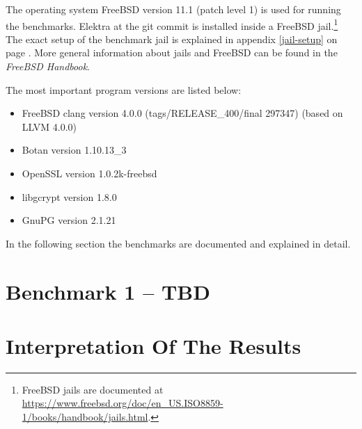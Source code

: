 The operating system FreeBSD version 11.1 (patch level 1) is used for running the benchmarks.
Elektra  at the git commit  is installed inside a FreeBSD jail.\footnote{FreeBSD jails
are documented at \url{https://www.freebsd.org/doc/en_US.ISO8859-1/books/handbook/jails.html}.
}
The exact setup of the benchmark jail is explained in appendix \ref{jail-setup} on page \pageref{jail-setup}.
More general information about jails and FreeBSD can be found in the \emph{FreeBSD Handbook}.\cite{freebsd-doc}

The most important program versions are listed below:

\begin{itemize}
  \item FreeBSD clang version 4.0.0 (tags/RELEASE\_400/final 297347) (based on LLVM 4.0.0)
  \item Botan version 1.10.13\_3
  \item OpenSSL version 1.0.2k-freebsd
  \item libgcrypt version 1.8.0
  \item GnuPG version 2.1.21
\end{itemize}

In the following section the benchmarks are documented and explained in detail.

\section{Benchmark 1 -- TBD}

\section{Interpretation Of The Results}
